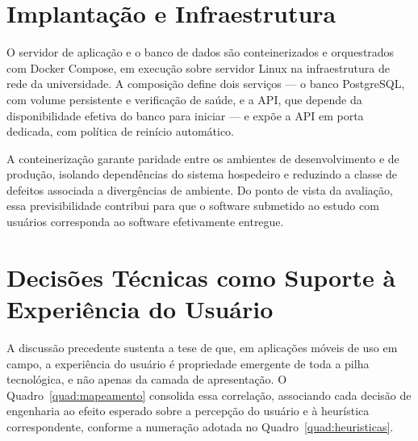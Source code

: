 \section{Implantação e Infraestrutura}
\label{sec:implantacao}

O servidor de aplicação e o banco de dados são conteinerizados e orquestrados com
Docker Compose, em execução sobre servidor Linux na infraestrutura de rede da
universidade. A composição define dois serviços --- o banco PostgreSQL, com volume
persistente e verificação de saúde, e a API, que depende da disponibilidade
efetiva do banco para iniciar --- e expõe a API em porta dedicada, com política de
reinício automático.

A conteinerização garante paridade entre os ambientes de desenvolvimento e de
produção, isolando dependências do sistema hospedeiro e reduzindo a classe de
defeitos associada a divergências de ambiente. Do ponto de vista da avaliação, essa
previsibilidade contribui para que o software submetido ao estudo com usuários
corresponda ao software efetivamente entregue.

\section{Decisões Técnicas como Suporte à Experiência do Usuário}
\label{sec:mapeamento}

A discussão precedente sustenta a tese de que, em aplicações móveis de uso em
campo, a experiência do usuário é propriedade emergente de toda a pilha
tecnológica, e não apenas da camada de apresentação. O Quadro~\ref{quad:mapeamento}
consolida essa correlação, associando cada decisão de engenharia ao efeito
esperado sobre a percepção do usuário e à heurística correspondente, conforme a
numeração adotada no Quadro~\ref{quad:heuristicas}.

